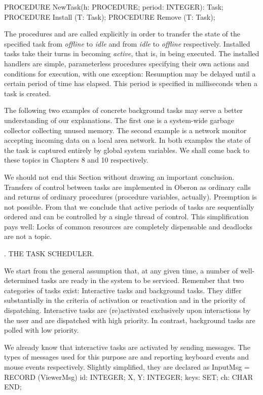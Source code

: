 PROCEDURE NewTask(h: PROCEDURE; period: INTEGER): Task;
PROCEDURE Install (T: Task);
PROCEDURE Remove (T: Task);
\endtt

\noindent The procedures  and  are called explicitly in order to
transfer the state of the specified task from \emph{offline\/} to \emph{idle\/} and from
\emph{idle\/} to \emph{offline\/} respectively. Installed tasks take their turns in
becoming \emph{active\/}, that is, in being executed. The installed handlers
are simple, parameterless procedures specifying their own actions and
conditions for execution, with one exception: Resumption may be
delayed until a certain period of time has elapsed. This period is
specified in milliseconds when a task is created.

The following two examples of concrete background tasks may serve a
better understanding of our explanations. The first one is a
system-wide garbage collector collecting unused memory. The second
example is a network monitor accepting incoming data on a local area
network. In both examples the state of the task is captured entirely
by global system variables. We shall come back to these topics in
Chapters 8 and 10 respectively.

We should not end this Section without drawing an important
conclusion. Transfers of control between tasks are implemented in
Oberon as ordinary calls and returns of ordinary procedures (procedure
variables, actually). Preemption is not possible. From that we
conclude that active periods of tasks are sequentially ordered and can
be controlled by a single thread of control. This simplification pays
well: Locks of common resources are completely dispensable and
deadlocks are not a topic.

. THE TASK SCHEDULER.

We start from the general assumption that, at any given time, a number
of well-determined tasks are ready in the system to be
serviced. Remember that two categories of tasks exist: Interactive
tasks and background tasks. They differ substantially in the criteria
of activation or reactivation and in the priority of
dispatching. Interactive tasks are (re)activated exclusively upon
interactions by the user and are dispatched with high priority. In
contrast, background tasks are polled with low priority.

We already know that interactive tasks are activated by sending messages. The types of messages used for this purpose are  and  reporting keyboard events and mouse events respectively. Slightly simplified, they are declared as
\begintt
InputMsg = RECORD (ViewerMsg)
  id: INTEGER;
  X, Y: INTEGER;
  keys: SET;
  ch: CHAR
END;

